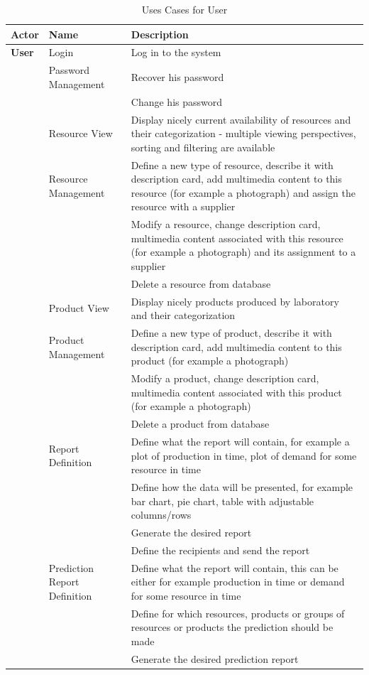 \documentclass[a4paper,11pt,twoside]{report}
\theoremstyle{definition}
\begin{document}
\begin{longtable}{|p{3cm}|p{3cm}|p{10cm}|}
\caption[Uses Cases for User]{Uses Cases for User}
\label{Uses Cases user}
\tabularnewline

\hline
\textbf{Actor} & \textbf{Name} & \textbf{Description} \\ \hline
\textbf{User} & Login & Log in to the system\\ \cline{2-3}
\texttt{} & Password \mbox{Management} & Recover his password\\ \cline{3-3}
\texttt{} & & Change his password\\ \cline{2-3}

\texttt{} & Resource View & Display nicely current availability of resources and their categorization - multiple viewing perspectives, sorting and filtering are available\\ \cline{2-3}
\texttt{} & Resource \mbox{Management} & Define a new type of resource, describe it with description card, add multimedia content to this resource (for example a photograph) and assign the resource with a supplier\\ \cline{3-3}
\texttt{} & & Modify a resource, change description card, multimedia content associated with this resource (for example a photograph) and its assignment to a supplier\\ \cline{3-3}
\texttt{} & & Delete a resource from database\\ \cline{2-3}

\texttt{} & Product View & Display nicely products produced by laboratory and their categorization\\ \cline{2-3}
\texttt{} & Product \mbox{Management} & Define a new type of product, describe it with description card, add multimedia content to this product (for example a photograph)\\ \cline{3-3}
\texttt{} & & Modify a product, change description card, multimedia content associated with this product (for example a photograph)\\ \cline{3-3}
\texttt{} & & Delete a product from database\\ \cline{2-3}
\texttt{} & Report \mbox{Definition} & Define what the report will contain, for example a plot of production in time, plot of demand for some resource in time\\ \cline{3-3}
\texttt{} & & Define how the data will be presented, for example bar chart, pie chart, table with adjustable columns/rows \\ \cline{3-3}
\texttt{} & & Generate the desired report \\ \cline{3-3}
\texttt{} & & Define the recipients and send the report \\ \cline{2-3}
\texttt{} & Prediction Report \mbox{Definition} & Define what the report will contain, this can be either for example production in time or demand for some resource in time\\ \cline{3-3}
\texttt{} & & Define for which resources, products or groups of resources or products the prediction should be made\\ \cline{3-3}
\texttt{} & & Generate the desired prediction report \\ \cline{3-3}


\end{longtable}
\end{document}
